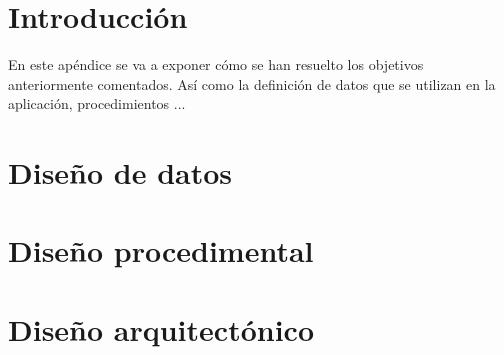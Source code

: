 
\section{Introducción}
En este apéndice se va a exponer cómo se han resuelto los objetivos anteriormente comentados. Así como la definición de datos que se utilizan en la aplicación, procedimientos ...

\section{Diseño de datos}

\section{Diseño procedimental}

\section{Diseño arquitectónico}


